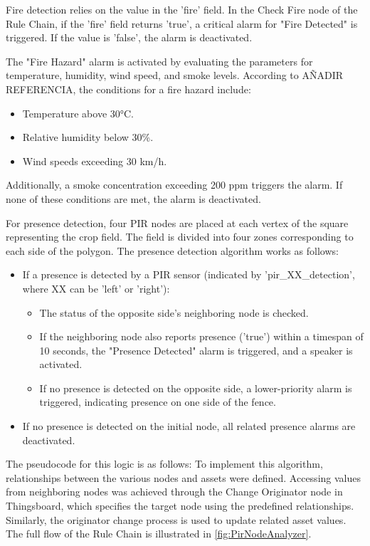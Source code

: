 Fire detection relies on the value in the 'fire' field. In the Check Fire node of the Rule Chain, if the 'fire' field returns 'true', a critical alarm for "Fire Detected"
is triggered. If the value is 'false', the alarm is deactivated.

The "Fire Hazard" alarm is activated by evaluating the parameters for temperature, humidity, wind speed, and smoke levels. According to AÑADIR REFERENCIA, the conditions 
for a fire hazard include:
\begin{itemize}
    \item Temperature above 30°C.
    \item Relative humidity below 30\%.
    \item Wind speeds exceeding 30 km/h.
\end{itemize}

Additionally, a smoke concentration exceeding 200 ppm triggers the alarm. If none of these conditions are met, the alarm is deactivated.

For presence detection, four PIR nodes are placed at each vertex of the square representing the crop field. The field is divided into four zones corresponding to each side 
of the polygon. The presence detection algorithm works as follows:
\begin{itemize}
    \item If a presence is detected by a PIR sensor (indicated by 'pir\_XX\_detection', where XX can be 'left' or 'right'):
    \begin{itemize}
        \item The status of the opposite side’s neighboring node is checked.
        \item If the neighboring node also reports presence ('true') within a timespan of 10 seconds, the "Presence Detected" alarm is triggered, and a speaker is activated.
        \item If no presence is detected on the opposite side, a lower-priority alarm is triggered, indicating presence on one side of the fence.
    \end{itemize}
    \item If no presence is detected on the initial node, all related presence alarms are deactivated. 
\end{itemize}

The pseudocode for this logic is as follows:
%
To implement this algorithm, relationships between the various nodes and assets were defined. Accessing values from neighboring nodes was achieved through the Change
Originator node in Thingsboard, which specifies the target node using the predefined relationships. Similarly, the originator change process is used to update related 
asset values. The full flow of the Rule Chain is illustrated in \autoref{fig:PirNodeAnalyzer}.

